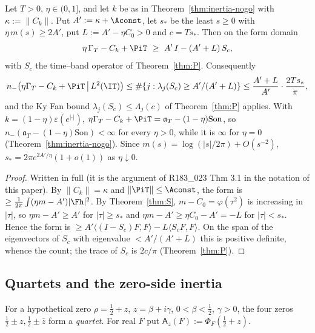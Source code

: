 \begin{theorem}\label{thm:inertia-finite}
Let $T>0$, $\eta\in(0,1]$, and let $k$ be as in Theorem~\ref{thm:inertia-nogo} with $\kappa:=\|C_k\|$. Put
$A':=\kappa+\Aconst$, let $s_*$ be the least $s\ge0$ with $\eta\,m(s)\ge2A'$, put $L:=A'-\eta C_0>0$ and
$c=Ts_*$. Then on the form domain
\[
\eta\,\Gamma_T-C_k+\PiT\ \ge\ A'\,I-(A'+L)\,S_c ,
\]
with $S_c$ the time--band operator of Theorem~\ref{thm:P}. Consequently
\[
n_-\big(\eta\Gamma_T-C_k+\PiT\,\big|\,L^2(\IT)\big)\le\#\{j:\lambda_j(S_c)\ge A'/(A'+L)\}
\le\frac{A'+L}{A'}\cdot\frac{2Ts_*}{\pi},
\]
and the Ky Fan bound $\lambda_j(S_c)\le\Lambda_j(c)$ of Theorem~\ref{thm:P} applies. With
$k=(1-\eta)\varepsilon(e^{|\cdot|})$, $\eta\Gamma_T-C_k+\PiT=\mathfrak a_T-(1-\eta)\mathrm{Son}$, so
$n_-(\mathfrak a_T-(1-\eta)\mathrm{Son})<\infty$ for every $\eta>0$, while it is $\infty$ for $\eta=0$
(Theorem~\ref{thm:inertia-nogo}). Since $m(s)=\log(|s|/2\pi)+O(s^{-2})$, $s_*=2\pi e^{2A'/\eta}(1+o(1))$ as $\eta\downarrow0$.
\end{theorem}
\begin{proof}
Written in full (it is the argument of R183\_023 Thm 3.1 in the notation of this paper). By $\|C_k\|=\kappa$ and
$\|\PiT\|\le\Aconst$, the form is $\ge\frac1{2\pi}\int(\eta m-A')|\Fh|^2$. By Theorem~\ref{thm:S}, $m-C_0=\varphi(\tau^2)$
is increasing in $|\tau|$, so $\eta m-A'\ge A'$ for $|\tau|\ge s_*$ and $\eta m-A'\ge\eta C_0-A'=-L$ for
$|\tau|<s_*$. Hence the form is $\ge A'\langle(I-S_c)F,F\rangle-L\langle S_cF,F\rangle$. On the span of the
eigenvectors of $S_c$ with eigenvalue $<A'/(A'+L)$ this is positive definite, whence the count; the trace of $S_c$
is $2c/\pi$ (Theorem~\ref{thm:P}).
\end{proof}

\subsection{Quartets and the zero-side inertia}
For a hypothetical zero $\rho=\frac12+z$, $z=\beta+i\gamma$, $0<\beta<\frac12$, $\gamma>0$, the four zeros
$\frac12\pm z,\frac12\pm\bar z$ form a \emph{quartet}. For real $F$ put $\mathsf A_z(F):=\Phi_F(\frac12+z)$.

